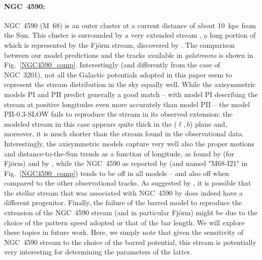             \paragraph{NGC~4590: } NGC~4590 (M~68) is an outer cluster at a current distance of about 10~kpc from the Sun. This cluster is surrounded by a very extended stream \citep{2019MNRAS.488.1535P, 2021ApJ...914..123I}, a long portion of which is represented by the Fj\"{o}rm stream, discovered by \citet{2021ApJ...914..123I}. The comparison between our model predictions and the tracks available in \textit{galstreams} is shown in Fig.~\ref{NGC4590_comp}. Interestingly (and differently from the case of NGC~3201), not all the Galactic potentials adopted in this paper seem to represent the stream distribution in the sky equally well. While the axisymmetric models PI and PII predict generally a good match -- with model PI describing the stream at positive longitudes even more accurately than model PII -- the model PII-0.3-SLOW fails to reproduce the stream in its observed extension: the modeled stream in this case appears quite thick in the ($\ell, b$) plane and, moreover, it is much shorter than the stream found in the observational data. Interestingly, the axisymmetric models capture very well also the proper motions and distance-to-the-Sun trends as a function of longitude, as found by \citet{2021ApJ...914..123I} (for  Fj\"{o}rm) and by \citet{2019MNRAS.488.1535P}, while the NGC~4590 as reported by \citet{2021ApJ...914..123I} (and named "M68-I21" in Fig.~\ref{NGC4590_comp}) tends to be off in all models -- and also off when compared to the other observational tracks. As suggested by \citet{2023MNRAS.520.5225M}, it is possible that the stellar stream that was associated with NGC~4590   by  \citet{2021ApJ...914..123I}does indeed have a different progenitor.  Finally, the failure of the barred model to reproduce the extension of the NGC~4590 stream (and in particular Fj\"{o}rm)  might be due to the choice of the pattern speed adopted or that of the bar length. We will explore these topics in future work. Here, we simply note that given the sensitivity of NGC~4590 stream to the choice of the barred potential, this stream is potentially very interesting for determining the parameters of the latter. 

